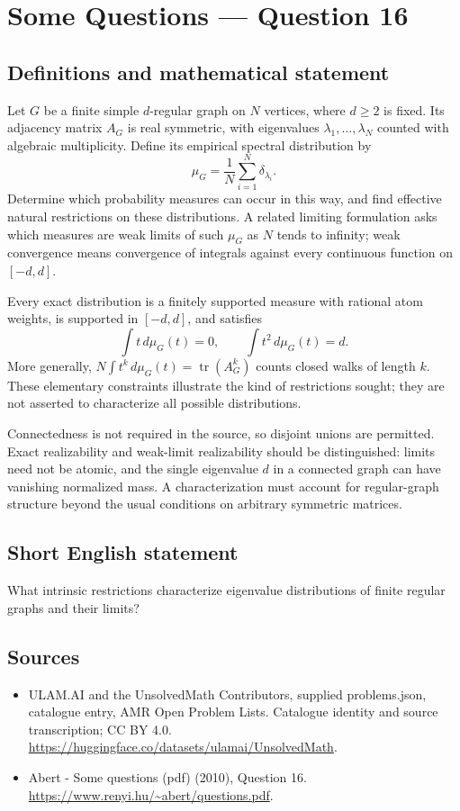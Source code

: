\documentclass[11pt,a4paper]{article}
\begin{document}
\section*{Some Questions — Question 16}\label{statement}

\subsection{Definitions and mathematical statement}
Let $G$ be a finite simple $d$-regular graph on $N$ vertices, where $d\geq2$ is fixed. Its adjacency matrix $A_G$ is real symmetric, with eigenvalues $\lambda_1,\ldots,\lambda_N$ counted with algebraic multiplicity. Define its empirical spectral distribution by
\[
 \mu_G=\frac1N\sum_{i=1}^N\delta_{\lambda_i}.
\]
Determine which probability measures can occur in this way, and find effective natural restrictions on these distributions. A related limiting formulation asks which measures are weak limits of such $\mu_G$ as $N$ tends to infinity; weak convergence means convergence of integrals against every continuous function on $[-d,d]$.

Every exact distribution is a finitely supported measure with rational atom weights, is supported in $[-d,d]$, and satisfies
\[
 \int t\,d\mu_G(t)=0,\qquad \int t^2\,d\mu_G(t)=d.
\]
More generally, $N\int t^k\,d\mu_G(t)=\operatorname{tr}(A_G^k)$ counts closed walks of length $k$. These elementary constraints illustrate the kind of restrictions sought; they are not asserted to characterize all possible distributions.

Connectedness is not required in the source, so disjoint unions are permitted. Exact realizability and weak-limit realizability should be distinguished: limits need not be atomic, and the single eigenvalue $d$ in a connected graph can have vanishing normalized mass. A characterization must account for regular-graph structure beyond the usual conditions on arbitrary symmetric matrices.
\subsection{Short English statement}
What intrinsic restrictions characterize eigenvalue distributions of finite regular graphs and their limits?
\subsection{Sources}
\begin{itemize}
\item[S1] ULAM.AI and the UnsolvedMath Contributors, supplied problems.json, catalogue entry, AMR Open Problem Lists. Catalogue identity and source transcription; CC BY 4.0.
\url{https://huggingface.co/datasets/ulamai/UnsolvedMath}.
\item[S2] Abert - Some questions (pdf) (2010), Question 16. 
\url{https://www.renyi.hu/~abert/questions.pdf}.
\end{itemize}
\end{document}
